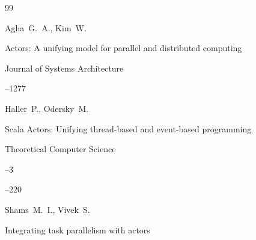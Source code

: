 \begin{thebibliography}{99}











\by Agha~G.~A., Kim~W.

\paper Actors: A unifying model for parallel and   distributed computing


\jour Journal of   Systems Architecture




--1277










\by Haller~P., Odersky~M.

\paper Scala Actors: Unifying thread-based and   event-based programming


\jour Theoretical   Computer Science



--3 

--220 























\by Shams~M.~I., Vivek~S.


\paper Integrating task parallelism  with actors


\end{thebibliography}
